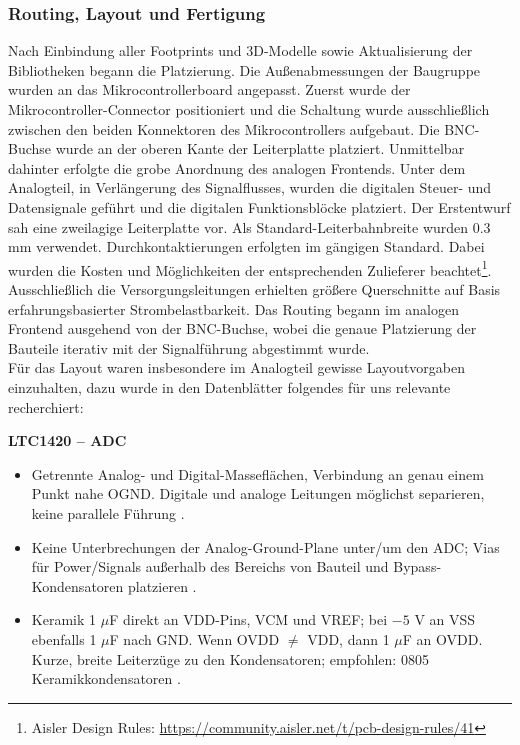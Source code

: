 \documentclass[a4paper, portrait, 12pt]{scrartcl} %
\begin{document}
\subsubsection{Routing, Layout und Fertigung}


Nach Einbindung aller Footprints und 3D-Modelle sowie Aktualisierung der Bibliotheken begann die Platzierung. Die Außenabmessungen der Baugruppe wurden an das Mikrocontrollerboard angepasst. Zuerst wurde der Mikrocontroller-Connector positioniert und die Schaltung wurde ausschließlich zwischen den beiden Konnektoren des Mikrocontrollers aufgebaut. Die BNC-Buchse wurde an der oberen Kante der Leiterplatte platziert. Unmittelbar dahinter erfolgte die grobe Anordnung des analogen Frontends. Unter dem Analogteil, in Verlängerung des Signalflusses, wurden die digitalen Steuer- und Datensignale geführt und die digitalen Funktionsblöcke platziert. Der Erstentwurf sah eine zweilagige Leiterplatte vor. Als Standard-Leiterbahnbreite wurden 0.3 mm verwendet. Durchkontaktierungen erfolgten im gängigen Standard. Dabei wurden die Kosten und Möglichkeiten der entsprechenden Zulieferer beachtet\footnote{Aisler Design Rules: \url{https://community.aisler.net/t/pcb-design-rules/41}}. Ausschließlich die Versorgungsleitungen erhielten größere Querschnitte auf Basis erfahrungsbasierter Strombelastbarkeit. Das Routing begann im analogen Frontend ausgehend von der BNC-Buchse, wobei die genaue Platzierung der Bauteile iterativ mit der Signalführung abgestimmt wurde.\\

Für das Layout waren insbesondere im Analogteil gewisse Layoutvorgaben einzuhalten, dazu wurde in den Datenblätter folgendes für uns relevante recherchiert:

\textbf{LTC1420 – ADC}

\begin{itemize}
    \item Getrennte Analog- und Digital-Masseflächen, Verbindung an genau einem Punkt nahe OGND. Digitale und analoge Leitungen möglichst separieren, keine parallele Führung \cite[S. 13]{LinearTechnology1420}.
    \item Keine Unterbrechungen der Analog-Ground-Plane unter/um den ADC; Vias für Power/Signals außerhalb des Bereichs von Bauteil und Bypass-Kondensatoren platzieren \cite[S. 13]{LinearTechnology1420}.
    \item Keramik 1 $\mu$F direkt an VDD-Pins, VCM und VREF; bei $-5$ V an VSS ebenfalls 1 $\mu$F nach GND. Wenn OVDD $\neq$ VDD, dann 1 $\mu$F an OVDD. Kurze, breite Leiterzüge zu den Kondensatoren; empfohlen: 0805 Keramikkondensatoren \cite[S. 13 u. 14]{LinearTechnology1420}.
\end{itemize}
\end{document}
